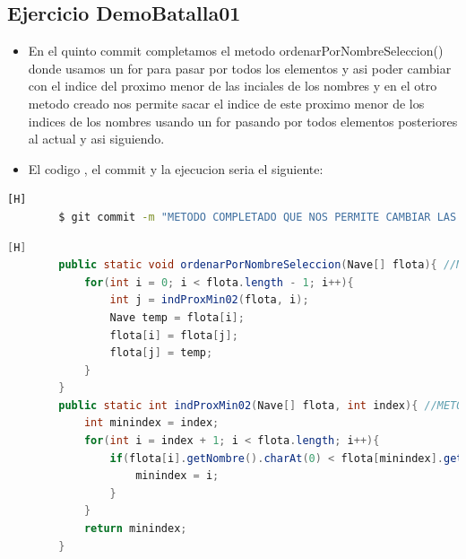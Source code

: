 \documentclass{article}
\begin{document}
	\subsection{Ejercicio DemoBatalla01}
	\begin{itemize}	
		\item En el quinto commit completamos el metodo ordenarPorNombreSeleccion() donde usamos un for para pasar por todos los elementos y asi poder cambiar con el indice del proximo menor de las inciales de los nombres y en el otro metodo creado nos permite sacar el indice de este proximo menor de los indices de los nombres usando un for pasando por todos elementos posteriores al actual y asi siguiendo. 
		\item El codigo , el commit y la ejecucion seria el siguiente:
	\end{itemize}
	\begin{lstlisting}[language=bash,caption={Commit}][H]
		$ git commit -m "METODO COMPLETADO QUE NOS PERMITE CAMBIAR LAS POSICIONES DE CADA ARREGLO DEPENDIENDO DE LO QUE RETORNE EL METODO indProxMin que sera el indice cual debemos cambiar con el actual y tambien METODO CREADO QUE NOS AYUDA A BUSCAR EL INDICE DEL OBJETO Y NOS DICE CUAL ES EL PROXIMO MENOR EN TERMINOS DE A HASTA Z APARTIR DEL QUE ESTAMOS Y VA PASANDO POR TODOS LOS ELEMENTOS ASI QUE VA ACTUALIZANDOSE LA VARIABLE MINDEX"
	\end{lstlisting}
	\begin{lstlisting}[language=java,caption={Las lineas de codigo del metodo completado:}][H]
		public static void ordenarPorNombreSeleccion(Nave[] flota){ //METODO COMPLETADO QUE NOS PERMITE CAMBIAR LAS POSICIONES DE CADA ARREGLO DEPENDIENDO DE LO QUE RETORNE EL METODO indProxMin que sera el indice cual debemos cambiar con el actual
			for(int i = 0; i < flota.length - 1; i++){
				int j = indProxMin02(flota, i);
				Nave temp = flota[i];
				flota[i] = flota[j];
				flota[j] = temp;
			}
		}
		public static int indProxMin02(Nave[] flota, int index){ //METODO CREADO QUE NOS AYUDA A BUSCAR EL INDICE DEL OBJETO Y NOS DICE CUAL ES EL PROXIMO MENOR EN TERMINOS DE A HASTA Z APARTIR DEL QUE ESTAMOS Y VA PASANDO POR TODOS LOS ELEMENTOS ASI QUE VA ACTUALIZANDOSE LA VARIABLE MINDEX
			int minindex = index;
			for(int i = index + 1; i < flota.length; i++){
				if(flota[i].getNombre().charAt(0) < flota[minindex].getNombre().charAt(0)){
					minindex = i;
				}
			}
			return minindex;
		}
	\end{lstlisting}
\end{document}
